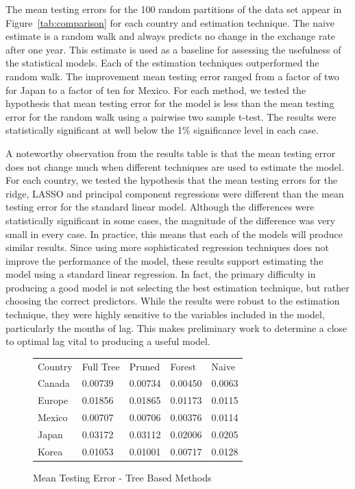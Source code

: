 \documentclass{sig-alternate-05-2015}
\begin{document}
The mean testing errors for the 100 random partitions of the data set appear in Figure~\ref{tab:comparison} for each country and estimation technique. The naive estimate is a random walk and always predicts no change in the exchange rate after one year. This estimate is used as a baseline for assessing the usefulness of the statistical models. Each of the estimation techniques outperformed the random walk. The improvement mean testing error ranged from a factor of two for Japan to a factor of ten for Mexico. For each method, we tested the hypothesis that mean testing error for the model is less than the mean testing error for the random walk using a pairwise two sample t-test. The results were statistically significant at well below the 1\% significance level in each case.
\par{} A noteworthy observation from the results table is that the mean testing error does not change much when different techniques are used to estimate the model. For each country, we tested the hypothesis that the mean testing errors for the ridge, LASSO and principal component regressions were different than the mean testing error for the standard linear model. Although the differences were statistically significant in some cases, the magnitude of the difference was very small in every case. In practice, this means that each of the models will produce similar results. Since using more sophisticated regression techniques does not improve the performance of the model, these results support estimating the model using a standard linear regression. In fact, the primary difficulty in producing a good model is not selecting the best estimation technique, but rather choosing the correct predictors. While the results were robust to the estimation technique, they were highly sensitive to the variables included in the model, particularly the months of lag. This makes preliminary work to determine a close to optimal lag vital to producing a useful model.

\begin{figure}
\centering
\caption{Mean Testing Error - Tree Based Methods}
\begin{tabular}{l l l l l}
Country	& Full Tree & Pruned    & Forest    & Naive \\
Canada 	& 0.00739 	& 0.00734 	& 0.00450 	& 0.0063 \\
Europe	& 0.01856 	& 0.01865 	& 0.01173	& 0.0115 \\
Mexico	& 0.00707 	& 0.00706 	& 0.00376   & 0.0114 \\
Japan	& 0.03172 	& 0.03112 	& 0.02006   & 0.0205 \\
Korea	& 0.01053 	& 0.01001 	& 0.00717	& 0.0128 \\
\end{tabular}
\label{tab:treecomparison}
\end{figure} 
\end{document}
